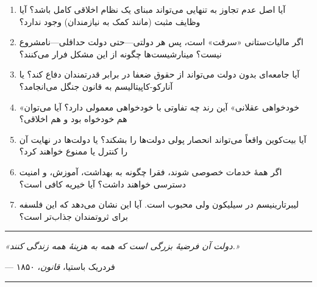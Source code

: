 \begin{tcolorbox}[
    enhanced,
    colback=centergreen!8,
    colframe=centergreen,
    boxrule=1.5pt,
    arc=5pt,
    fonttitle=\bfseries,
    title={\rl{❓ پرسش‌هایی برای تأمل و بحث}}
]
\begin{enumerate}
    \item آیا اصل عدم تجاوز به تنهایی می‌تواند مبنای یک نظام اخلاقی کامل باشد؟ آیا وظایف مثبت (مانند کمک به نیازمندان) وجود ندارد؟
    
    \item اگر مالیات‌ستانی «سرقت» است، پس هر دولتی—حتی دولت حداقلی—نامشروع نیست؟ مینارشیست‌ها چگونه از این مشکل فرار می‌کنند؟
    
    \item آیا جامعه‌ای بدون دولت می‌تواند از حقوق ضعفا در برابر قدرتمندان دفاع کند؟ یا آنارکو-کاپیتالیسم به قانون جنگل می‌انجامد؟
    
    \item «خودخواهی عقلانی» آین رند چه تفاوتی با خودخواهی معمولی دارد؟ آیا می‌توان هم خودخواه بود و هم اخلاقی؟
    
    \item آیا بیت‌کوین واقعاً می‌تواند انحصار پولی دولت‌ها را بشکند؟ یا دولت‌ها در نهایت آن را کنترل یا ممنوع خواهند کرد؟
    
    \item اگر همهٔ خدمات خصوصی شوند، فقرا چگونه به بهداشت، آموزش، و امنیت دسترسی خواهند داشت؟ آیا خیریه کافی است؟
    
    \item لیبرتارینیسم در سیلیکون ولی محبوب است. آیا این نشان می‌دهد که این فلسفه برای ثروتمندان جذاب‌تر است؟
\end{enumerate}
\end{tcolorbox}


\vspace{10mm}
\begin{center}
\rule{0.6\textwidth}{1pt}

\vspace{3mm}
\textit{«دولت آن فرضیهٔ بزرگی است که همه به هزینهٔ همه زندگی کنند.»}

\vspace{2mm}
--- فردریک باستیا، \textit{قانون}، ۱۸۵۰

\vspace{3mm}
\rule{0.6\textwidth}{1pt}
\end{center}